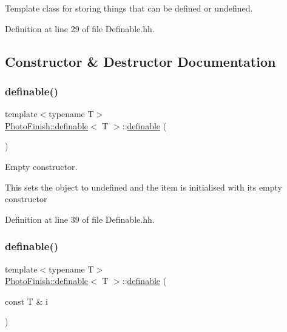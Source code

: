Template class for storing things that can be defined or undefined. 

Definition at line 29 of file Definable.\+hh.



\subsection{Constructor \& Destructor Documentation}
\mbox{\label{class_photo_finish_1_1definable_ac1efd98687fba9bb936b66fc050fedc1}} 
\subsubsection{\texorpdfstring{definable()}{definable()}\hspace{0.1cm}{\footnotesize\ttfamily [1/2]}}
{\footnotesize\ttfamily template$<$typename T$>$ \\
\hyperlink{class_photo_finish_1_1definable}{Photo\+Finish\+::definable}$<$ T $>$\+::\hyperlink{class_photo_finish_1_1definable}{definable} (\begin{DoxyParamCaption}{ }\end{DoxyParamCaption})\hspace{0.3cm}{\ttfamily [inline]}}



Empty constructor. 

This sets the object to undefined and the item is initialised with its empty constructor 

Definition at line 39 of file Definable.\+hh.

\mbox{\label{class_photo_finish_1_1definable_ac101abb7feaf8b5c6477c4f396ed7240}} 
\subsubsection{\texorpdfstring{definable()}{definable()}\hspace{0.1cm}{\footnotesize\ttfamily [2/2]}}
{\footnotesize\ttfamily template$<$typename T$>$ \\
\hyperlink{class_photo_finish_1_1definable}{Photo\+Finish\+::definable}$<$ T $>$\+::\hyperlink{class_photo_finish_1_1definable}{definable} (\begin{DoxyParamCaption}\item[{const T \&}]{i }\end{DoxyParamCaption})\hspace{0.3cm}{\ttfamily [inline]}}



